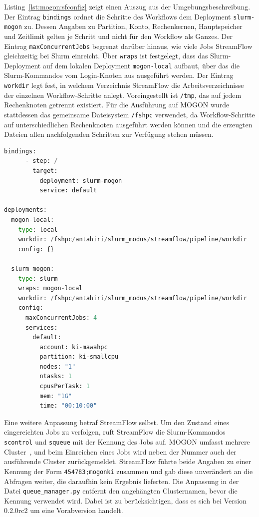 Listing~\ref{lst:mogon:sfconfig} zeigt einen Auszug aus der
Umgebungsbeschreibung. Der Eintrag \texttt{bindings} ordnet die
Schritte des Workflows dem Deployment \texttt{slurm-mogon} zu.
Dessen Angaben zu Partition, Konto, Rechenkernen, Hauptspeicher und
Zeitlimit gelten je Schritt und nicht für den Workflow als Ganzes.
Der Eintrag \texttt{maxConcurrentJobs} begrenzt darüber hinaus, wie
viele Jobs StreamFlow gleichzeitig bei Slurm einreicht. Über
\texttt{wraps} ist festgelegt, dass das Slurm-Deployment auf dem
lokalen Deployment \texttt{mogon-local} aufbaut, über das die
Slurm-Kommandos vom Login-Knoten aus ausgeführt werden. Der Eintrag
\texttt{workdir} legt fest, in welchem Verzeichnis StreamFlow die
Arbeitsverzeichnisse der einzelnen Workflow-Schritte anlegt.
Voreingestellt ist \texttt{/tmp}, das auf jedem Rechenknoten
getrennt existiert. Für die Ausführung auf MOGON wurde stattdessen
das gemeinsame Dateisystem \texttt{/fshpc} verwendet, da
Workflow-Schritte auf unterschiedlichen Rechenknoten ausgeführt
werden können und die erzeugten Dateien allen nachfolgenden
Schritten zur Verfügung stehen müssen.

\begin{lstlisting}[language=Python,
  caption={Auszug aus der Umgebungsbeschreibung von StreamFlow für die Ausführung auf MOGON},
  label={lst:mogon:sfconfig}]
    bindings:
      - step: /
        target:
          deployment: slurm-mogon
          service: default

deployments:
  mogon-local:
    type: local
    workdir: /fshpc/antahiri/slurm_modus/streamflow/pipeline/workdir
    config: {}

  slurm-mogon:
    type: slurm
    wraps: mogon-local
    workdir: /fshpc/antahiri/slurm_modus/streamflow/pipeline/workdir
    config: 
      maxConcurrentJobs: 4
      services:
        default:
          account: ki-mawahpc
          partition: ki-smallcpu
          nodes: "1"
          ntasks: 1
          cpusPerTask: 1
          mem: "1G"
          time: "00:10:00"
\end{lstlisting}

Eine weitere Anpassung betraf StreamFlow selbst. Um den Zustand
eines eingereichten Jobs zu verfolgen, ruft StreamFlow die
Slurm-Kommandos \texttt{scontrol} und \texttt{squeue} mit der
Kennung des Jobs auf. MOGON umfasst mehrere Cluster~\cite{mogondocs-what}, und beim
Einreichen eines Jobs wird neben der Nummer auch der ausführende
Cluster zurückgemeldet. StreamFlow führte
beide Angaben zu einer Kennung der Form \texttt{454783;mogonki}
zusammen und gab diese unverändert an die Abfragen weiter, die
daraufhin kein Ergebnis lieferten. Die Anpassung in der Datei
\texttt{queue\_manager.py} entfernt den angehängten Clusternamen,
bevor die Kennung verwendet wird. Dabei ist zu berücksichtigen,
dass es sich bei Version 0.2.0rc2 um eine Vorabversion handelt.

